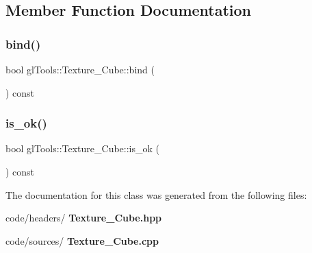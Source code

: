 \subsection{Member Function Documentation}
\mbox{\label{classgl_tools_1_1_texture___cube_a2b3ebb968ee94ade0a53fe203e47828f}} 
\subsubsection{bind()}
{\footnotesize\ttfamily bool gl\+Tools\+::\+Texture\+\_\+\+Cube\+::bind (\begin{DoxyParamCaption}{ }\end{DoxyParamCaption}) const\hspace{0.3cm}{\ttfamily [inline]}}

\mbox{\label{classgl_tools_1_1_texture___cube_ac8f7e987b42115959a1d76b865c20e8f}} 
\subsubsection{is\_ok()}
{\footnotesize\ttfamily bool gl\+Tools\+::\+Texture\+\_\+\+Cube\+::is\+\_\+ok (\begin{DoxyParamCaption}{ }\end{DoxyParamCaption}) const\hspace{0.3cm}{\ttfamily [inline]}}



The documentation for this class was generated from the following files\+:\begin{DoxyCompactItemize}
\item 
code/headers/\textbf{ Texture\+\_\+\+Cube.\+hpp}\item 
code/sources/\textbf{ Texture\+\_\+\+Cube.\+cpp}\end{DoxyCompactItemize}
